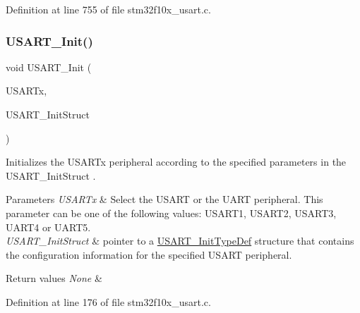Definition at line 755 of file stm32f10x\+\_\+usart.\+c.

\mbox{\label{group___u_s_a_r_t___private___functions_ga98da340ea0324002ba1b4263e91ab2ff}} 
\subsubsection{\texorpdfstring{U\+S\+A\+R\+T\+\_\+\+Init()}{USART\_Init()}}
{\footnotesize\ttfamily void U\+S\+A\+R\+T\+\_\+\+Init (\begin{DoxyParamCaption}\item[{\hyperlink{struct_u_s_a_r_t___type_def}{U\+S\+A\+R\+T\+\_\+\+Type\+Def} $\ast$}]{U\+S\+A\+R\+Tx,  }\item[{\hyperlink{struct_u_s_a_r_t___init_type_def}{U\+S\+A\+R\+T\+\_\+\+Init\+Type\+Def} $\ast$}]{U\+S\+A\+R\+T\+\_\+\+Init\+Struct }\end{DoxyParamCaption})}



Initializes the U\+S\+A\+R\+Tx peripheral according to the specified parameters in the U\+S\+A\+R\+T\+\_\+\+Init\+Struct . 


\begin{DoxyParams}{Parameters}
{\em U\+S\+A\+R\+Tx} & Select the U\+S\+A\+RT or the U\+A\+RT peripheral. This parameter can be one of the following values\+: U\+S\+A\+R\+T1, U\+S\+A\+R\+T2, U\+S\+A\+R\+T3, U\+A\+R\+T4 or U\+A\+R\+T5. \\
\hline
{\em U\+S\+A\+R\+T\+\_\+\+Init\+Struct} & pointer to a \hyperlink{struct_u_s_a_r_t___init_type_def}{U\+S\+A\+R\+T\+\_\+\+Init\+Type\+Def} structure that contains the configuration information for the specified U\+S\+A\+RT peripheral. \\
\hline
\end{DoxyParams}

\begin{DoxyRetVals}{Return values}
{\em None} & \\
\hline
\end{DoxyRetVals}


Definition at line 176 of file stm32f10x\+\_\+usart.\+c.

